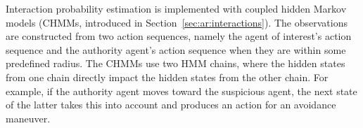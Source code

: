 Interaction probability estimation is implemented with coupled hidden Markov models (CHMMs, introduced in Section~\ref{sec:ar:interactions}).
%
The observations are constructed from two action sequences, namely the agent of interest's action sequence and the  authority agent's action sequence when they are within some predefined radius. The CHMMs use two HMM chains, where the hidden states from one chain directly impact the hidden states from the other chain. 
For example, if the authority agent moves toward the suspicious agent, the next state of the latter takes this into account and produces an action for an avoidance maneuver. 




